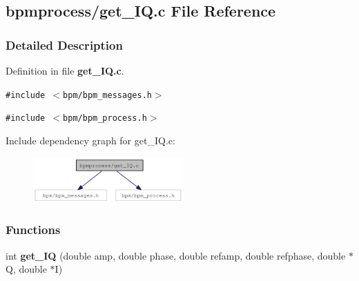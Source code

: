 \subsection{bpmprocess/get\_\-IQ.c File Reference}
\label{get__IQ_8c}


\subsubsection{Detailed Description}


Definition in file {\bf get\_\-IQ.c}.

{\tt \#include $<$bpm/bpm\_\-messages.h$>$}\par
{\tt \#include $<$bpm/bpm\_\-process.h$>$}\par


Include dependency graph for get\_\-IQ.c:\nopagebreak
\begin{figure}[H]
\begin{center}
\leavevmode
\includegraphics[width=162pt]{get__IQ_8c__incl}
\end{center}
\end{figure}
\subsubsection*{Functions}
\begin{CompactItemize}
\item 
int {\bf get\_\-IQ} (double amp, double phase, double refamp, double refphase, double $\ast$Q, double $\ast$I)
\end{CompactItemize}
